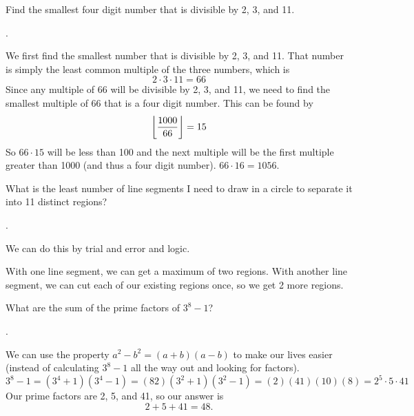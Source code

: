 \documentclass[11pt]{article}
\DeclareRobustCommand{\frac}[3][0pt]{%
  {\begingroup\hspace{#1}#2\hspace{#1}\endgroup\over\hspace{#1}#3\hspace{#1}}}
\begin{document}
\begin{problem}Find the smallest four digit number that is divisible by 2, 3, and 11.
\end{problem}
\begin{answer}
.
\end{answer}
\begin{solution}
We first find the smallest number that is divisible by 2, 3, and 11. That number is simply the least common multiple of the three numbers, which is
$$2\cdot 3\cdot 11=66$$
Since any multiple of 66 will be divisible by 2, 3, and 11, we need to find the smallest multiple of 66 that is a four digit number. This can be found by
$$\floor{\frac{1000}{66}}=15$$
So $66 \cdot 15$ will be less than 100 and the next multiple will be the first multiple greater than 1000 (and thus a four digit number). $66 \cdot 16 = \boxed{1056}.$
\end{solution}


\begin{problem}
What is the least number of line segments I need to draw in a circle to separate it into 11 distinct regions?
\end{problem}
\begin{answer}
.
\end{answer}
\begin{solution}
We can do this by trial and error and logic. \par
With one line segment, we can get a maximum of two regions. With another line segment, we can cut each of our existing regions once, so we get 2 more regions.
\end{solution}

\begin{problem}
What are the sum of the prime factors of $3^{8}-1$?
\end{problem}
\begin{answer}
.
\end{answer}
\begin{solution}
We can use the property $a^2-b^2 = (a+b)(a-b)$ to make our lives easier (instead of calculating $3^8-1$ all the way out and looking for factors).
$$3^8-1 = (3^4+1)(3^4-1) = (82)(3^2+1)(3^2-1)=(2)(41)(10)(8)=2^5 \cdot 5 \cdot 41$$
Our prime factors are 2, 5, and 41, so our answer is
$$2+5+41 = \boxed{48}.$$
\end{solution}
\end{document}
